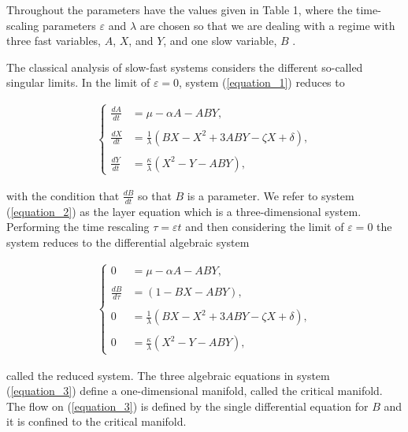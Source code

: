 \documentclass{ws-ijbc}
\begin{document}
Throughout the parameters have the values given in Table 1, where the time-scaling parameters $\varepsilon$ and $\lambda$ are chosen so that we are dealing with a regime with three fast variables, $A$, $X$, and $Y$, and one slow variable, $B$ \cite{Rescaling}.
    
The classical analysis of slow-fast systems considers the different so-called singular limits.  In the limit of $\varepsilon = 0$, system (\ref{equation_1}) reduces to
    
\begin{equation}
\begin{aligned}
\begin{cases}
\frac{dA}{dt} &= \mu - \alpha A - ABY, \\ \\
\frac{dX}{dt} &= \frac{1}{\lambda}(BX - X^2 +3ABY - \zeta X + \delta), \\ \\
\frac{dY}{dt} &= \frac{\kappa}{\lambda}(X^2 - Y - ABY),
\end{cases}
\end{aligned}
\label{equation_2}
\end{equation}
    
\noindent
with the condition that $\frac{dB}{dt}$ so that $B$ is a parameter.  We refer to system (\ref{equation_2}) as the layer equation which is a three-dimensional system.  Performing the time rescaling $\tau = \varepsilon t$ and then considering the limit of $\varepsilon = 0$ the system reduces to the differential algebraic system
    
 \begin{equation}
\begin{aligned}
\begin{cases}
0 &= \mu - \alpha A - ABY, \\ \\
\frac{dB}{d\tau} &= (1-BX - ABY), \\ \\
0 &= \frac{1}{\lambda}(BX - X^2 +3ABY - \zeta X + \delta), \\ \\
0 &= \frac{\kappa}{\lambda}(X^2 - Y - ABY),
\end{cases}
\end{aligned}
\label{equation_3}
\end{equation}
    
\noindent
called the reduced system. The three algebraic equations in system (\ref{equation_3}) define a one-dimensional manifold, called the critical manifold.  The flow on (\ref{equation_3}) is defined by the single differential equation for $B$ and it is confined to the critical manifold.  
\end{document}
